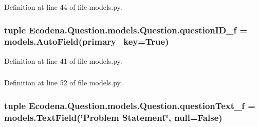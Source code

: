 Definition at line 44 of file models.py.

\hypertarget{class_ecodena_1_1_question_1_1models_1_1_question_a7bf8bc3dae949f1011c2e26226309898}{
\subsubsection[{questionID\_\-f}]{\setlength{\rightskip}{0pt plus 5cm}tuple {\bf Ecodena.Question.models.Question.questionID\_\-f} = models.AutoField(primary\_\-key=True)}}
\label{d1/d67/class_ecodena_1_1_question_1_1models_1_1_question_a7bf8bc3dae949f1011c2e26226309898}


Definition at line 41 of file models.py.

\hypertarget{class_ecodena_1_1_question_1_1models_1_1_question_a82d6ae1631802a2652e2c5ddb91a4ea7}{
\subsubsection[{questionID\_\-f}]{}}
\label{d1/d67/class_ecodena_1_1_question_1_1models_1_1_question_a82d6ae1631802a2652e2c5ddb91a4ea7}


Definition at line 52 of file models.py.

\hypertarget{class_ecodena_1_1_question_1_1models_1_1_question_a68dff1fccf327def311e574aef8c7385}{
\subsubsection[{questionText\_\-f}]{\setlength{\rightskip}{0pt plus 5cm}tuple {\bf Ecodena.Question.models.Question.questionText\_\-f} = models.TextField(\char`\"{}Problem Statement\char`\"{}, null=False)}}
\label{d1/d67/class_ecodena_1_1_question_1_1models_1_1_question_a68dff1fccf327def311e574aef8c7385}


